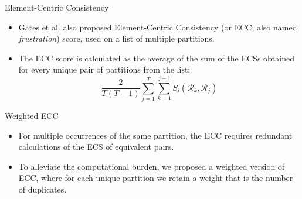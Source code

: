 \begin{frame}{Element-Centric Consistency}
    \begin{itemize}
        \item Gates et al. also proposed Element-Centric Consistency (or ECC; also named  \textit{frustration}) score, used on a list of multiple partitions.
        \item The ECC score is calculated as the average of the sum of the ECSs obtained for every unique pair of partitions from the list:
              \begin{equation*}
                  \frac{2}{T(T-1)} \sum_{j=1}^T \sum_{k=1}^{j-1} S_i (\mathcal{R}_k, \mathcal{R}_j)
              \end{equation*}
    \end{itemize}
\end{frame}


\begin{frame}[label=wecc]{Weighted ECC}
    \begin{itemize}
        \item For multiple occurrences of the same partition, the ECC requires redundant calculations of the ECS of equivalent pairs.
        \item To alleviate the computational burden, we proposed a weighted version of ECC, where for each unique partition we retain a weight that is the number of duplicates.
    \end{itemize}
    \hyperlink{proof}{}
\end{frame}


